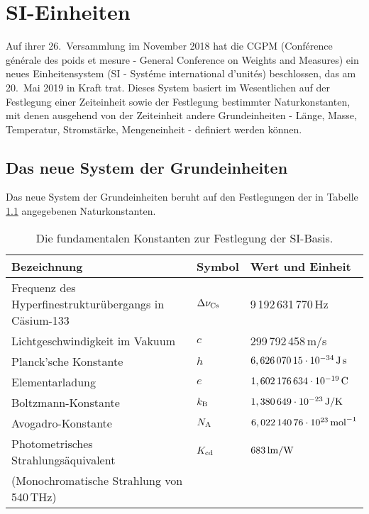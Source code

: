 

\chapter{SI-Einheiten}
\label{chap_SI}

Auf ihrer 26.\ Versammlung im November 2018 hat die CGPM (Conf\'{e}rence g\'{e}n\'{e}rale des poids et mesure -
General Conference on Weights and Measures)  
ein neues Einheitensystem (SI - Syst\'{e}me international d'unit\'{e}s) 
beschlossen, das am 20.\ Mai 2019 in Kraft trat. Dieses System basiert im Wesentlichen auf der
Festlegung einer Zeiteinheit sowie der Festlegung bestimmter Naturkonstanten, mit denen ausgehend von der
Zeiteinheit andere Grundeinheiten - L\"ange, Masse, Temperatur, Stromst\"arke, 
Mengeneinheit - definiert werden k\"onnen. 


\section{Das neue System der Grundeinheiten}

Das neue System der Grundeinheiten beruht auf den Festlegungen der in Tabelle \ref{tab_SI}
angegebenen Naturkonstanten.%
%
%

\begin{table}[htb]
\begin{tabular}{l|l|l}
Bezeichnung & Symbol & Wert und Einheit \\ \hline
Frequenz des Hyperfinestruktur\"ubergangs in C\"asium-133 & $\Delta \nu_{\rm Cs}$ &
        9\,192\,631\,770\,{\rm Hz} \\
Lichtgeschwindigkeit im Vakuum & $c$ & 299\,792\,458\,{\rm m/s} \\ 
Planck'sche Konstante & $h$ & $6,626\,070\,15 \cdot 10^{-34}\,{\rm J\,s}$ \\
Elementarladung & $e$ & $1,602\,176\,634 \cdot 10^{-19}\,{\rm C}$ \\
Boltzmann-Konstante & $k_{\rm B}$ & $1,380\,649 \cdot 10^{-23}\,{\rm J/K}$ \\
Avogadro-Konstante & $N_{\rm A}$ & $ 6,022\,140\,76 \cdot 10^{23}\,{\rm mol}^{-1}$ \\
Photometrisches Strahlungs\"aquivalent & $K_{\rm cd}$ & $683\,{\rm lm/W}$ \\[-0.1cm]
(Monochromatische Strahlung von 540\,THz) & &  \\ \hline        
\end{tabular}
\caption{\label{tab_SI}%
Die fundamentalen Konstanten zur Festlegung der SI-Basis.}
\end{table}

